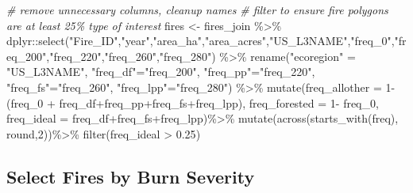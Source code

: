 \documentclass[
]{book}
\newenvironment{Shaded}{\begin{snugshade}}{\end{snugshade}}
\newcommand{\AttributeTok}[1]{\textcolor[rgb]{0.77,0.63,0.00}{#1}}
\newcommand{\CommentTok}[1]{\textcolor[rgb]{0.56,0.35,0.01}{\textit{#1}}}
\newcommand{\DecValTok}[1]{\textcolor[rgb]{0.00,0.00,0.81}{#1}}
\newcommand{\FloatTok}[1]{\textcolor[rgb]{0.00,0.00,0.81}{#1}}
\newcommand{\FunctionTok}[1]{\textcolor[rgb]{0.00,0.00,0.00}{#1}}
\newcommand{\NormalTok}[1]{#1}
\newcommand{\OtherTok}[1]{\textcolor[rgb]{0.56,0.35,0.01}{#1}}
\newcommand{\SpecialCharTok}[1]{\textcolor[rgb]{0.00,0.00,0.00}{#1}}
\newcommand{\StringTok}[1]{\textcolor[rgb]{0.31,0.60,0.02}{#1}}
\begin{document}
\begin{Shaded}
\begin{Highlighting}[]
\CommentTok{\# remove unnecessary columns, cleanup names}
\CommentTok{\# filter to ensure fire polygons are at least 25\% type of interest}
\NormalTok{fires }\OtherTok{\textless{}{-}}\NormalTok{ fires\_join }\SpecialCharTok{\%\textgreater{}\%} 
\NormalTok{  dplyr}\SpecialCharTok{::}\FunctionTok{select}\NormalTok{(}\StringTok{"Fire\_ID"}\NormalTok{,}\StringTok{"year"}\NormalTok{,}\StringTok{"area\_ha"}\NormalTok{,}\StringTok{"area\_acres"}\NormalTok{,}\StringTok{"US\_L3NAME"}\NormalTok{,}\StringTok{"freq\_0"}\NormalTok{,}\StringTok{"freq\_200"}\NormalTok{,}\StringTok{"freq\_220"}\NormalTok{,}\StringTok{"freq\_260"}\NormalTok{,}\StringTok{"freq\_280"}\NormalTok{) }\SpecialCharTok{\%\textgreater{}\%} 
  \FunctionTok{rename}\NormalTok{(}\StringTok{"ecoregion"} \OtherTok{=} \StringTok{"US\_L3NAME"}\NormalTok{,}
         \StringTok{"freq\_df"}\OtherTok{=}\StringTok{"freq\_200"}\NormalTok{,}
         \StringTok{"freq\_pp"}\OtherTok{=}\StringTok{"freq\_220"}\NormalTok{,}
         \StringTok{"freq\_fs"}\OtherTok{=}\StringTok{"freq\_260"}\NormalTok{,}
         \StringTok{"freq\_lpp"}\OtherTok{=}\StringTok{"freq\_280"}\NormalTok{) }\SpecialCharTok{\%\textgreater{}\%} 
  \FunctionTok{mutate}\NormalTok{(}\AttributeTok{freq\_allother =} \DecValTok{1}\SpecialCharTok{{-}}\NormalTok{(freq\_0 }\SpecialCharTok{+}\NormalTok{ freq\_df}\SpecialCharTok{+}\NormalTok{freq\_pp}\SpecialCharTok{+}\NormalTok{freq\_fs}\SpecialCharTok{+}\NormalTok{freq\_lpp),}
         \AttributeTok{freq\_forested =} \DecValTok{1}\SpecialCharTok{{-}}\NormalTok{ freq\_0,}
         \AttributeTok{freq\_ideal =}\NormalTok{ freq\_df}\SpecialCharTok{+}\NormalTok{freq\_fs}\SpecialCharTok{+}\NormalTok{freq\_lpp)}\SpecialCharTok{\%\textgreater{}\%} 
  \FunctionTok{mutate}\NormalTok{(}\FunctionTok{across}\NormalTok{(}\FunctionTok{starts\_with}\NormalTok{(}\StringTok{\textquotesingle{}freq\textquotesingle{}}\NormalTok{), round,}\DecValTok{2}\NormalTok{))}\SpecialCharTok{\%\textgreater{}\%} 
  \FunctionTok{filter}\NormalTok{(freq\_ideal }\SpecialCharTok{\textgreater{}} \FloatTok{0.25}\NormalTok{)}
\end{Highlighting}
\end{Shaded}

\hypertarget{select-fires-by-burn-severity}{%
\subsection{Select Fires by Burn Severity}\label{select-fires-by-burn-severity}}
\end{document}
